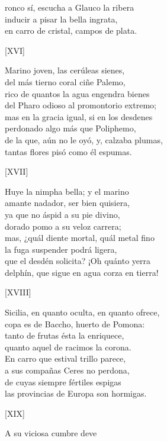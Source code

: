 \documentclass[11pt,a4paper,twoside]{article}
\begin{document}
ronco sí, escucha a Glauco la ribera\\
inducir a pisar la bella ingrata,\\
en carro de cristal, campos de plata.\pend
\begin{center}
	[XVI]
\end{center}\pstart
Marino joven, las cerúleas sienes,\\
del más tierno coral ciñe Palemo,\\
rico de quantos la agua engendra bienes\\
del Pharo odioso al promontorio extremo;\\
mas en la gracia igual, si en los desdenes\\
perdonado algo más que Poliphemo,\\
de la que, aún no le oyó, y, calzaba plumas,\\
tantas flores pisó como él espumas.\pend
\begin{center}
	[XVII]
\end{center}\pstart
Huye la nimpha bella; y el marino\\
amante nadador, ser bien quisiera,\\
ya que no áspid a su pie divino,\\
dorado pomo a su veloz carrera;\\
mas, ¿quál diente mortal, quál metal fino\\
la fuga suspender podrá ligera,\\
que el desdén solicita? ¡Oh quánto yerra\\
delphín, que sigue en agua corza en tierra!\pend
\begin{center}
	[XVIII]
\end{center}\pstart
Sicilia, en quanto oculta, en quanto ofrece,\\
copa es de Baccho, huerto de Pomona:\\
tanto de frutas ésta la enriquece,\\
quanto aquel de racimos la corona.\\
En carro que estival trillo parece,\\
a sus compañas Ceres no perdona,\\
de cuyas siempre fértiles espigas\\
las provincias de Europa son hormigas.\pend
\begin{center}
	[XIX]
\end{center}\pstart
A  su viciosa cumbre deve\\
\end{document}
